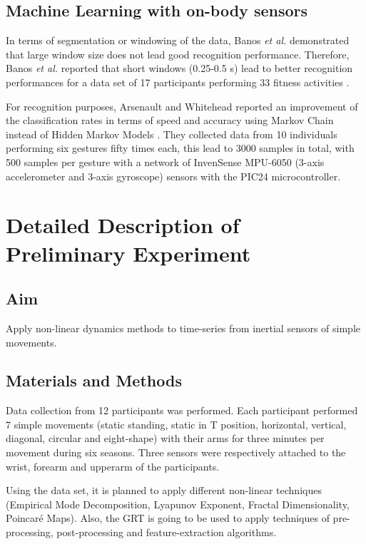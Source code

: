 \documentclass[9pt,journal,onecolumn,compsoc]{IEEEtran}
\begin{document}
\subsection{Machine Learning with on-body sensors}


In terms of segmentation or windowing of the data, Banos \textit{et al.}
demonstrated that large window size does not lead good recognition performance.
Therefore, Banos \textit{et al.} reported that short windows (0.25-0.5 s) lead to better recognition performances
for a data set of 17 participants performing 33 fitness activities \cite{Banos2014}.

For recognition purposes, Arsenault and Whitehead reported an improvement of the classification rates
in terms of speed and accuracy using Markov Chain instead of Hidden Markov Models \cite{Arsenault2015_a, Arsenault2015_b}.
They collected data from 10 individuals performing six gestures fifty times each,
this lead to 3000 samples in total, with 500 samples per gesture
with a network of InvenSense MPU-6050 (3-axis accelerometer and 3-axis gyroscope) sensors with the  PIC24 microcontroller.


\section{Detailed Description of Preliminary Experiment}

\subsection{Aim}
Apply non-linear dynamics methods to time-series from inertial sensors of
simple movements.

\subsection{Materials and Methods}
Data collection from 12 participants was performed.
Each participant performed 7 simple movements (static standing, static in T position, horizontal,
vertical, diagonal, circular and eight-shape) with their arms for three minutes per movement
during six seasons.
Three sensors were respectively attached to the wrist, forearm and upperarm of the participants.

Using the data set, it is planned to apply different non-linear techniques
(Empirical Mode Decomposition, Lyapunov Exponent, Fractal Dimensionality, Poincar\'e Maps).
Also, the GRT is going to be used to apply techniques of
pre-processing, post-processing and feature-extraction algorithms.
\end{document}
